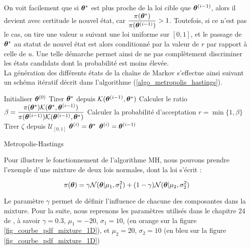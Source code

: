 On voit facilement que si ${{\bm{\theta}}^*}$ est plus proche de la loi cible que ${{\bm{\theta}}^{(i-1)}}$, alors il devient avec certitude le nouvel état, car $\dfrac{\pi({{\bm{\theta}}^*})}{\pi({{\bm{\theta}}^{(i-1)}})} > 1$. Toutefois, si ce n'est pas le cas, on tire une valeur $u$ suivant une loi uniforme sur $[0,1]$, et le passage de ${{\bm{\theta}}^*}$ au statut de nouvel état est alors conditionné par la valeur de $r$ par rapport à celle de $u$. Une telle démarche permet ainsi de ne pas complètement discriminer les états candidats dont la probabilité est moins élevée. \\

La génération des différents états de la chaîne de Markov s'effectue ainsi suivant un schéma itératif décrit dans l'algorithme (\ref{algo_metropolis_hastings}). \\

\begin{algorithm}
	\begin{algorithmic}
		\State Initialiser ${\bm{\theta}}^{(0)}$
			\State Tirer ${{\bm{\theta}}^*}$ depuis ${\mathcal{K}}({{\bm{\theta}}^{(i-1)}}, {{\bm{\theta}}^*})$
			\State Calculer le ratio $\beta  =\dfrac{\pi({{\bm{\theta}}^*}){\mathcal{K}}({{\bm{\theta}}^*}, {{\bm{\theta}}^{(i-1)}})}{\pi({{\bm{\theta}}^{(i-1)}}){\mathcal{K}}({{\bm{\theta}}^{(i-1)}}, {{\bm{\theta}}^*})}$
			\State Calculer la probabilité d'acceptation $r  =\min\{1,\beta\} $
			\State Tirer $\zeta$ depuis $\mathcal{U}_{[0,1]}$
				\State ${{\bm{\theta}}^{(i)}} = {{\bm{\theta}}^*}$
				\Else
				\State ${{\bm{\theta}}^{(i)}} = {{\bm{\theta}}^{(i-1)}}$
			\EndIf
		\EndFor
	\end{algorithmic}
\caption{Metropolis-Hastings}
\label{algo_metropolis_hastings}
\end{algorithm}

Pour illustrer le fonctionnement de l'algorithme MH, nous pouvons prendre l'exemple d'une mixture de deux lois normales, dont la loi s'écrit : 

\begin{equation}
\pi({\bm{\theta}}) = \gamma \mathcal{N}({\bm{\theta}} | \mu_1, \sigma_1^2) + (1-\gamma)\mathcal{N}({\bm{\theta}} | \mu_2, \sigma_2^2)
\label{eq_mixture_2_gaussiennes_1D}
\end{equation}

Le paramètre $\gamma$ permet de définir l'influence de chacune des composantes dans la mixture. Pour la suite, nous reprenons les paramètres utilisés dans le chapitre 24 de  \cite{Murphy2012}, à savoir $\gamma = 0.3$, $\mu_1 = -20$, $\sigma_1 = 10$,  (en orange sur la figure \ref{fig_courbe_pdf_mixture_1D}), et $\mu_2 = 20$, $\sigma_2 = 10$ (en bleu sur la figure \ref{fig_courbe_pdf_mixture_1D})

